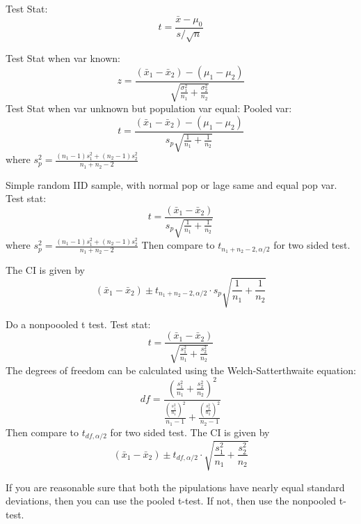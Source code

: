 \documentclass[answers,12pt,addpoints]{exam}
\begin{document}
\begin{remark}
    Test Stat:
    \[
    t = \frac{\bar{x} - \mu_0}{s / \sqrt{n}}
    \]
\end{remark}

\begin{definition}
    Test Stat when var known:
    \[
    z = \frac{(\bar{x}_1 - \bar{x}_2) - (\mu_1 - \mu_2)}{\sqrt{\frac{\sigma_1^2}{n_1} + \frac{\sigma_2^2}{n_2}}}
    \]
    Test Stat when var unknown but population var equal: Pooled var:
    \[
    t = \frac{(\bar{x}_1 - \bar{x}_2) - (\mu_1 - \mu_2)}{s_p\sqrt{\frac{1}{n_1} + \frac{1}{n_2}}}
    \]
    where $s_p^2 = \frac{(n_1 - 1)s_1^2 + (n_2 - 1)s_2^2}{n_1 + n_2 - 2}$
\end{definition}

\begin{remark}
    Simple random IID sample, with normal pop or lage same and equal pop var. Test stat:
\[
t = \frac{(\bar{x}_1 - \bar{x}_2) }{s_p\sqrt{\frac{1}{n_1} + \frac{1}{n_2}}}
\]
where $s_p^2 = \frac{(n_1 - 1)s_1^2 + (n_2 - 1)s_2^2}{n_1 + n_2 - 2}$
Then compare to $t_{n_1 + n_2 - 2, \alpha/2}$ for two sided test.

The CI is given by 
\[
    (\bar{x}_1 - \bar{x}_2) \pm t_{n_1 + n_2 - 2, \alpha/2} \cdot s_p\sqrt{\frac{1}{n_1} + \frac{1}{n_2}}
\]
\end{remark}

\begin{remark}
    Do a nonpoooled t test. Test stat:
\[
t = \frac{(\bar{x}_1 - \bar{x}_2) }{\sqrt{\frac{s_1^2}{n_1} + \frac{s_2^2}{n_2}}}
\]
The degrees of freedom can be calculated using the Welch-Satterthwaite equation:
\[
df = \frac{\left( \frac{s_1^2}{n_1} + \frac{s_2^2}{n_2} \right)^2}{\frac{\left( \frac{s_1^2}{n_1} \right)^2}{n_1 - 1} + \frac{\left( \frac{s_2^2}{n_2} \right)^2}{n_2 - 1}}
\]
Then compare to $t_{df, \alpha/2}$ for two sided test.
The CI is given by
\[
    (\bar{x}_1 - \bar{x}_2) \pm t_{df, \alpha/2} \cdot \sqrt{\frac{s_1^2}{n_1} + \frac{s_2^2}{n_2}}
\]
\end{remark}

\begin{remark}
If you are reasonable sure that both the pipulations have nearly equal standard deviations, then you can use the pooled t-test. If not, then use the nonpooled t-test.
\end{remark}
\end{document}
